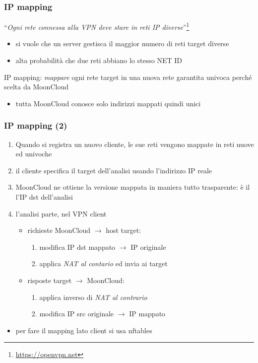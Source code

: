 \begin{frame}
	\frametitle{IP mapping}
	``\textit{Ogni rete connessa alla VPN deve stare in reti IP diverse}''\footnote{\url{https://openvpn.net}}
	\begin{itemize}
		\item si vuole che un server gestisca il maggior numero di reti target diverse
		\item alta probabilità che due reti abbiano lo stesso NET ID
	\end{itemize}
	
	\alert{IP mapping}: \textit{mappare} ogni rete target in una nuova rete
	\alert{garantita univoca} perché scelta da MoonCloud
	\begin{itemize}
		\item tutta MoonCloud conosce solo indirizzi mappati quindi unici
	\end{itemize}
\end{frame}

\begin{frame}
	\frametitle{IP mapping (2)}
	\begin{enumerate}
		\item Quando si registra un nuovo cliente, le sue reti vengono \alert{mappate}
		      in reti nuove ed univoche
		      
		\item il cliente specifica il target dell'analisi usando l'indirizzo IP reale
		              
		\item MoonCloud ne ottiene la \alert{versione mappata} in maniera tutto
		      \alert{trasparente}: è il l'IP dst dell'analisi
		      
		\item l'analisi parte, nel \alert{VPN client}
		      \begin{itemize}
		      	\item richieste MoonCloud $\rightarrow$ host target:
		      	      \begin{enumerate}
		      	      	\item modifica IP dst mappato $\rightarrow$ IP originale
		      	      	\item applica \textit{NAT al contario} ed invia ai target
		      	      \end{enumerate}
		      	\item risposte target $\rightarrow$ MoonCloud:
		      	      \begin{enumerate}
		      	      	\item applica inverso di \textit{NAT al contrario}
		      	      	\item modifica IP src originale $\rightarrow$ IP mappato
		      	      \end{enumerate}
		      \end{itemize}
		      
	\end{enumerate}
	
	\begin{itemize}
		\item per fare il mapping lato client si usa \alert{nftables}
	\end{itemize}
\end{frame}

